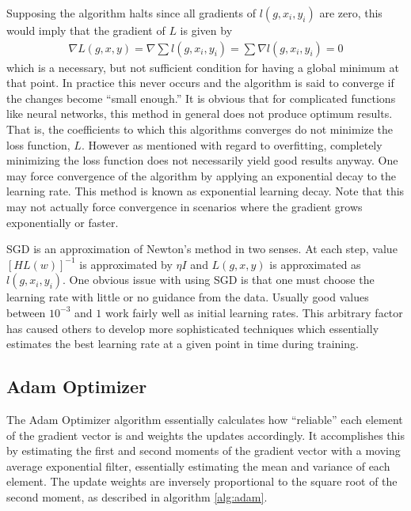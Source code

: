 Supposing the algorithm halts since all gradients of $l(g,x_i,y_i)$ are zero, this would imply that the gradient of $L$ is given by
\begin{align}
\nabla L(g,x,y) = \nabla \sum l(g,x_i,y_i) = \sum \nabla l(g,x_i,y_i) = 0
\end{align}
 which is a necessary, but not sufficient condition for having a global minimum at that point.  In practice this never occurs and the algorithm is said to converge if the changes become ``small enough.''  It is obvious that for complicated functions like neural networks, this method in general does not produce optimum results.  That is, the coefficients to which this algorithms converges do not minimize the loss function, $L$.  However as mentioned with regard to overfitting, completely minimizing the loss function does not necessarily yield good results anyway.  One may force convergence of the algorithm by applying an exponential decay to the learning rate.  This method is known as exponential learning decay.  Note that this may not actually force convergence in scenarios where the gradient grows exponentially or faster.  

SGD is an approximation of Newton's method in two senses.  At each step, value $[HL(w)]^{-1}$ is approximated by $\eta I$ and $L(g,x,y)$ is approximated as $l(g,x_i,y_i)$.  One obvious issue with using SGD is that one must choose the learning rate with little or no guidance from the data.  Usually good values between $10^{-3}$ and $1$ work fairly well as initial learning rates.  This arbitrary factor has caused others to develop more sophisticated techniques which essentially estimates the best learning rate at a given point in time during training.

\subsection{Adam Optimizer}
The Adam Optimizer algorithm \cite{pd14} essentially calculates how ``reliable'' each element of the gradient vector is and weights the updates accordingly.  It accomplishes this by estimating the first and second moments of the gradient vector with a moving average exponential filter, essentially estimating the mean and variance of each element.  The update weights are inversely proportional to the square root of the second moment, as described in algorithm \ref{alg:adam}.

